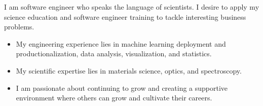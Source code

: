 
\begin{cvparagraph}
I am software engineer who speaks the language of scientists. I desire to apply
my science education and software engineer training to tackle interesting business problems.
\begin{itemize}[noitemsep]
    \item{ 
        My engineering experience lies in machine learning deployment and productionalization,
        data analysis, visualization, and statistics.
    }

    \item {
        My scientific expertise lies in materials science, optics, and spectroscopy.
    }

    \item {
        I am passionate about continuing to grow and creating a supportive
        environment where others can grow and cultivate their careers.
    }
\end{itemize}
\end{cvparagraph}
